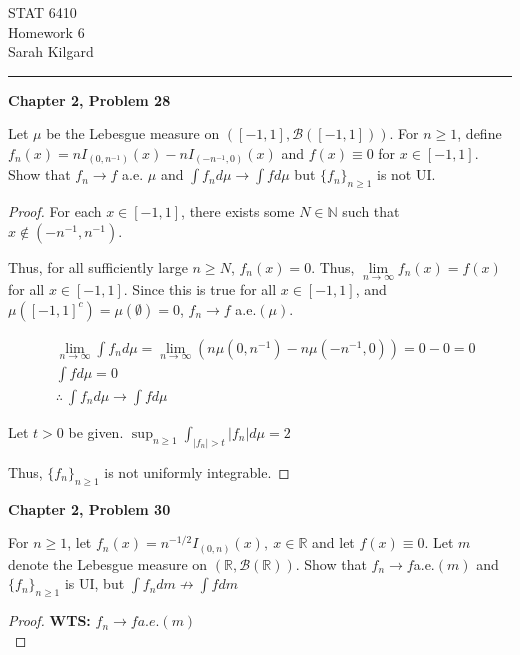 \documentclass[12pt,letterpaper, onecolumn]{exam}
\newcommand{\real}{\mathbb{R}}
\newcommand{\nat}{\mathbb{N}}
\newcommand{\calB}{\mathcal{B}}
\newcommand{\borel}{\mathcal{B}(\mathbb{R})}
\begin{document}
\begingroup  
    \centering
    \LARGE STAT 6410\\
    \LARGE Homework 6\\[0.5em]
    \large Sarah Kilgard\par
\endgroup
\rule{\textwidth}{0.4pt}
\pointsdroppedatright   %
\printanswers
\renewcommand{\solutiontitle}{\noindent\textbf{Ans:}\enspace}   %

\begin{questions}
    \question \textbf{Chapter 2, Problem 28}

    Let $\mu$ be the Lebesgue measure on $([-1, 1], \calB([-1, 1]))$. For $n \geq 1$, define $f_n(x) = n I_{(0, n^{-1})}(x) - n I_{(-n^{-1}, 0)}(x)$ and $f(x) \equiv 0$ for $x \in [-1, 1]$. Show that $f_n \to f$ a.e. $\mu$ and $\int f_n d\mu \to \int f d\mu$ but $\{f_n\}_{n \geq 1}$ is not UI.
    \begin{solution}
        \begin{proof}
            For each $x \in [-1,1]$, there exists some $N \in \nat$ such that $x \notin (-n^{-1}, n^{-1})$.

            Thus, for all sufficiently large $n \geq N$, $f_n(x) = 0$. Thus, $\lim\limits_{n \to \infty} f_n(x) = f(x)$ for all $x \in [-1, 1].$ Since this is true for all $x \in [-1, 1]$, and $\mu([-1, 1]^c) = \mu(\emptyset) = 0$, $f_n \to f$ a.e.$(\mu)$.

            \begin{align*}
                & \lim\limits_{n \to \infty} \int f_n d\mu = \lim\limits_{n \to \infty} (n \mu(0, n^{-1}) - n \mu(-n^{-1}, 0)) = 0 - 0 = 0 \\
                & \int f d\mu = 0 \\
                & \therefore \: \int f_n d\mu \to \int f d\mu
            \end{align*}

            Let $t > 0$ be given.
            $\sup_{n \geq 1} \int_{|f_n| > t} |f_n| d\mu = 2$

            Thus, $\{f_n\}_{n \geq 1}$ is not uniformly integrable.
        \end{proof}
    \end{solution}

    \question \textbf{Chapter 2, Problem 30}

    For $n \geq 1$, let $f_n(x) = n^{-1/2}I_{(0, n)}(x), \: x \in \real$ and let $f(x) \equiv 0$. Let $m$ denote the Lebesgue measure on $(\real, \borel)$. Show that $f_n \to f$a.e.$(m)$ and $\{f_n\}_{n\geq1}$ is UI, but $\int f_n dm \not\to \int f dm$
    \begin{solution}
        \begin{proof}
            \textbf{WTS:} $f_n \to f a.e.(m)$ \\
            

\end{proof}
\end{solution}
\end{questions}
\end{document}
